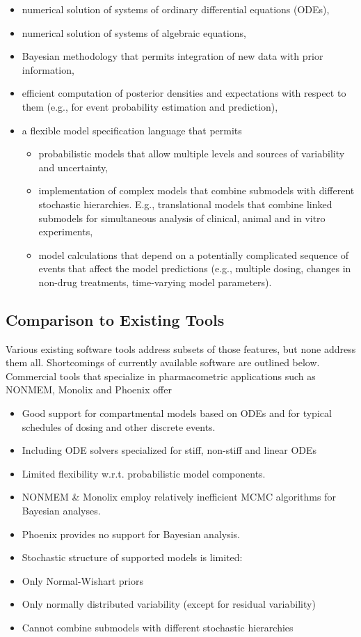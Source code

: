 \documentclass[11pt]{nih2016}
\begin{document}
\begin{itemize}
\item numerical solution of systems of ordinary differential equations
  (ODEs),
\item numerical solution of systems of algebraic equations,
\item Bayesian methodology that permits integration of new data with
  prior information,
\item efficient computation of posterior densities and expectations
  with respect to them (e.g., for event probability estimation and
  prediction),
\item a flexible model specification language that permits
\begin{itemize}
\item probabilistic models that allow multiple levels and sources of
  variability and uncertainty,
\item implementation of complex models that combine submodels with
  different stochastic hierarchies. E.g., translational models that
  combine linked submodels for simultaneous analysis of clinical,
  animal and in vitro experiments,
\item model calculations that depend on a
  potentially complicated sequence of events that affect the model
  predictions (e.g., multiple dosing, changes in non-drug treatments,
  time-varying model parameters).
\end{itemize}
\end{itemize}

\subsection{Comparison to Existing Tools}\label{existing}

Various existing software tools address subsets of those features, but
none address them all. Shortcomings of currently available software
are outlined below. Commercial tools that specialize in pharmacometric
applications such as NONMEM, Monolix and Phoenix offer

\begin{itemize}
\item Good support for compartmental models based on ODEs and for
  typical schedules of dosing and other discrete events.
\item Including ODE solvers specialized for stiff, non-stiff and
  linear ODEs
\item Limited flexibility w.r.t. probabilistic model components.
\item NONMEM \& Monolix employ relatively inefficient MCMC algorithms
  for Bayesian analyses.
\item Phoenix provides no support for Bayesian analysis.
\item Stochastic structure of supported models is limited:
\item Only Normal-Wishart priors
\item Only normally distributed variability (except for residual
  variability)
\item Cannot combine submodels with different stochastic hierarchies
\end{itemize}
\end{document}
